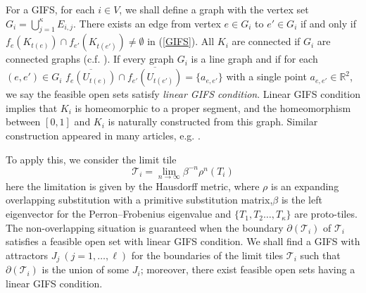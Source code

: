 \documentclass[a4]{amsart}
\newcommand{\R}{{\mathbb R}}
\theoremstyle{definition}
\begin{document}
For a GIFS, for each $i\in V$, 
we shall define a graph with the vertex set 
$G_i=\bigcup_{j=1}^\kappa E_{i,j}$.
There exists an edge 
from vertex $e\in G_{i}$ to $e'\in G_{i}$ if and only if
$f_e(K_{t(e)})\cap f_{e'}(K_{t(e')})\neq \emptyset$ in (\ref{GIFS}).
All $K_{i}$ are connected if $G_i$ are connected graphs (c.f. 
\cite{Hata:85,Luo-Akiyama-Thuswaldner:04}).
If every graph $G_i$ is a line graph and if
for each $(e,e')\in G_i$
$\overline{f_e(U_{t(e)})}\cap \overline{f_{e'}(U_{t(e')})}=\{a_{e,e'}\}$ 
with a single point $a_{e,e'}\in \R^2$, 
we say the feasible open sets satisfy {\it linear GIFS condition}.
Linear GIFS condition implies that $K_i$ is homeomorphic to a proper segment, and the homeomorphism between $[0,1]$ and $K_i$ is naturally constructed from this graph.
Similar construction appeared in many articles, e.g. 
\cite{Bandt-Mekhontsev:18,
Akiyama-Loridant:11}.

To apply this, we consider the limit tile
$$
\mathcal{T}_i=\lim_{n\to \infty} \beta^{-n} \rho^n(T_i)
$$
here the limitation is given by the Hausdorff metric, where $\rho$ is an expanding overlapping substitution with a primitive substitution matrix,$\beta$ is the left eigenvector for the Perron--Frobenius eigenvalue and $\{T_1,T_2\dots,T_{\kappa}\}$ are proto-tiles. 
The non-overlapping situation is guaranteed when 
the boundary $\partial(\mathcal{T}_i)$ of $\mathcal{T}_i$
satisfies a feasible open set with linear GIFS condition. 
We shall find a GIFS with attractors $J_j\ (j=1,\dots,\ell)$ 
for the boundaries of the limit tiles $\mathcal{T}_i$ such that $\partial(\mathcal{T}_i)$ is the union of some $J_i$; moreover, there exist feasible open sets having a linear GIFS condition. 
\end{document}

